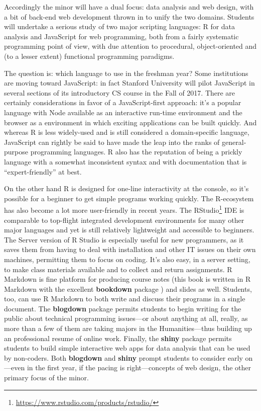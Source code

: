\documentclass[]{book}
\let\rmarkdownfootnote\footnote%
\def\footnote{\protect\rmarkdownfootnote}
\renewcommand{\href}[2]{#2\footnote{\url{#1}}}
\renewcommand{\href}[2]{#2\footnote{\url{#1}}}
\theoremstyle{definition}
\theoremstyle{definition}
\theoremstyle{remark}
\begin{document}
Accordingly the minor will have a dual focus: data analysis and web
design, with a bit of back-end web development thrown in to unify the
two domains. Students will undertake a serious study of two major
scripting languages: R for data analysis and JavaScript for web
programming, both from a fairly systematic programming point of view,
with due attention to procedural, object-oriented and (to a lesser
extent) functional programming paradigms.

The question is: which language to use in the freshman year? Some
institutions are moving toward JavaScript: in fact Stanford University
will pilot JavaScript in several sections of its introductory CS course
in the Fall of 2017. There are certainly considerations in favor of a
JavaScript-first approach: it's a popular language with Node available
as an interactive run-time environment and the browser as a environment
in which exciting applications can be built quickly. And whereas R is
less widely-used and is still considered a domain-specific language,
JavaScript can rightly be said to have made the leap into the ranks of
general-purpose programming languages. R also has the reputation of
being a prickly language with a somewhat inconsistent syntax and with
documentation that is ``expert-friendly'' at best.

On the other hand R is designed for one-line interactivity at the
console, so it's possible for a beginner to get simple programs working
quickly. The R-ecosystem has also become a lot more user-friendly in
recent years. The
\href{https://www.rstudio.com/products/rstudio/}{RStudio} IDE is
comparable to top-flight integrated development environments for many
other major languages and yet is still relatively lightweight and
accessible to beginners. The Server version of R Studio is especially
useful for new programmers, as it saves them from having to deal with
installation and other IT issues on their own machines, permitting them
to focus on coding. It's also easy, in a server setting, to make class
materials available and to collect and return assignments. R Markdown is
fine platform for producing course notes (this book is written in R
Markdown with the excellent \textbf{bookdown} package
\citep{R-bookdown}) and slides as well. Students, too, can use R
Markdown to both write and discuss their programs in a single document.
The \textbf{blogdown} package \citep{R-blogdown} permits students to
begin writing for the public about technical programming issues---or
about anything at all, really, as more than a few of them are taking
majors in the Humanities---thus building up an professional resume of
online work. Finally, the \textbf{shiny} package \citep{R-shiny} permits
students to build simple interactive web apps for data analysis that can
be used by non-coders. Both \textbf{blogdown} and \textbf{shiny} prompt
students to consider early on---even in the first year, if the pacing is
right---concepts of web design, the other primary focus of the minor.
\end{document}
